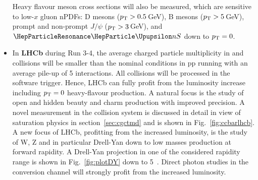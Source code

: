 \documentclass[../report.tex]{subfiles}
\begin{document}
\begin{itemize}
Heavy flavour meson cross sections will also be measured, which are sensitive to low-$x$ gluon nPDFs: D mesons ($p\sb{\scriptstyle\mathrm{T}}>0.5$\,GeV), B mesons ($p\sb{\scriptstyle\mathrm{T}}>5$\,GeV), prompt and non-prompt $J/\psi$ ($p\sb{\scriptstyle\mathrm{T}}>3$\,GeV), and $\PGUP{nS}$ down to $p\sb{\scriptstyle\mathrm{T}}=0$. 
\item In \textbf{LHCb} during Run 3-4, the average charged particle multiplicity in \pPb and \Pbp collisions will be smaller than the nominal conditions in pp running with an average  pile-up of 5 interactions. All \pPb collisions will be processed in the software trigger. Hence, LHCb can fully profit from the luminosity increase including $p\sb{\scriptstyle\mathrm{T}}=0$ heavy-flavour production.  A natural focus is the study of open and hidden beauty and charm production with improved precision. A novel measurement in the \pPb collision system is discussed in detail in view of saturation physics in section~\ref{sec:cgctmd} and is shown in Fig.~\ref{fig:ccbarlhcb}.  A new focus of LHCb, profitting from the increased luminosity, is the study of W, Z and in particular Drell-Yan down to low masses production at forward rapidity. A Drell-Yan projection in one of the considered rapidity range is shown in Fig.~\ref{fig:plotDY} down to 5~\UGeVcc. Direct photon studies in the conversion channel will strongly profit from the increased luminosity. 
\end{itemize}
\end{document}
